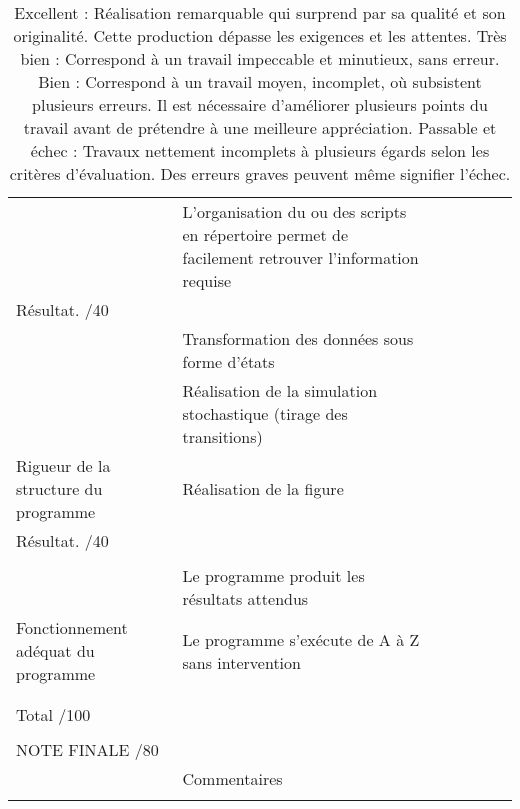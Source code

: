 \begin{longtable}{lllllll}
   &
    L'organisation du ou des scripts en répertoire permet de facilement retrouver l'information requise &
     &
     &
     &
     &
     \\
  \rowcolor[HTML]{DAE8FC} 
  Résultat.                                                         /40 &
     &
     &
     &
     &
     &
     \\
   &
    Transformation des données sous forme d'états &
    \multicolumn{1}{r}{} &
     &
     &
     &
     \\
   &
    Réalisation de la simulation stochastique (tirage des transitions) &
     &
     &
     &
     &
     \\
  \multirow{-3}{*}{Rigueur de la structure du programme} &
    Réalisation de la figure &
     &
     &
     &
     &
     \\
  \rowcolor[HTML]{DAE8FC} 
  Résultat.                                                         /40 &
     &
     &
     &
     &
     &
     \\
   &
     &
    \multicolumn{1}{r}{} &
     &
     &
     &
     \\
   &
    Le programme produit les résultats attendus &
     &
     &
     &
     &
    \multicolumn{1}{l|}{} \\
  \multirow{-3}{*}{Fonctionnement adéquat du programme} &
    Le programme s'exécute de A à Z sans intervention &
     &
     &
     &
     &
    \multicolumn{1}{l|}{} \\
  \rowcolor[HTML]{DAE8FC} 
  \multicolumn{1}{|l}{\cellcolor[HTML]{DAE8FC}Résultat.                                                         /20} &
     &
     &
     &
     &
     &
    \multicolumn{1}{l|}{\cellcolor[HTML]{DAE8FC}} \\ \hline
  \multicolumn{1}{|l|}{} &
    \multicolumn{6}{l|}{} \\
  \multicolumn{1}{|l|}{\multirow{-2}{*}{Total                                                               /100}} &
    \multicolumn{6}{l|}{} \\ \cline{1-1}
  \multicolumn{1}{|l|}{} &
    \multicolumn{6}{l|}{} \\
  \multicolumn{1}{|l|}{NOTE FINALE                                                /80} &
    \multicolumn{6}{l|}{} \\
  \multicolumn{1}{|l|}{} &
    \multicolumn{6}{l|}{\multirow{-5}{*}{Commentaires}} \\ \hline
  \caption{Excellent : Réalisation remarquable qui surprend par sa qualité et son originalité. Cette production dépasse les exigences et les attentes.
  Très bien : Correspond à un travail impeccable et minutieux, sans erreur.
  Bien : Correspond à un travail moyen, incomplet, où subsistent plusieurs erreurs. Il est nécessaire d’améliorer plusieurs points du travail avant de prétendre à une meilleure appréciation​.
  Passable et échec : Travaux nettement incomplets à plusieurs égards selon les critères d’évaluation. Des erreurs graves peuvent même signifier l’échec.​ }
  \label{tab:my-table}\\
  \end{longtable}